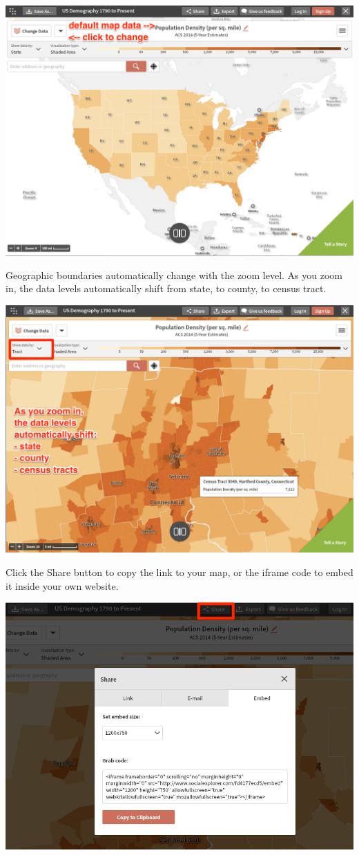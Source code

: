 \documentclass[
  english,
]{book}
\begin{document}
\includegraphics{images/06-map/SE-default-map.png}

Geographic boundaries automatically change with the zoom level. As you zoom in, the data levels automatically shift from state, to county, to census tract.

\includegraphics{images/06-map/SE-data-levels.png}

Click the Share button to copy the link to your map, or the iframe code to embed it inside your own website.

\includegraphics{images/06-map/SE-share-embed.png}
\end{document}
